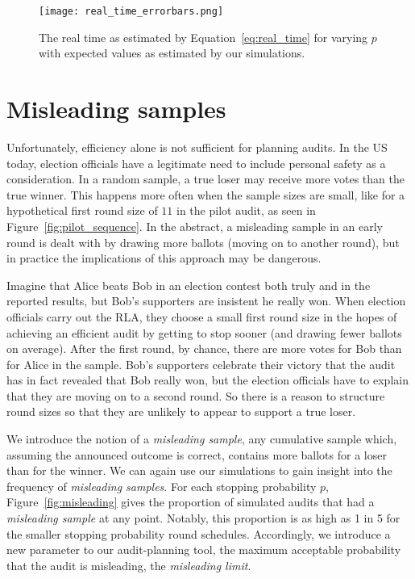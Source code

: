 \begin{figure}
\texttt{[image: real\_time\_errorbars.png]}
\caption{The real time as estimated by Equation~\ref{eq:real_time} for varying $p$ with expected values as estimated by our simulations.}
\label{fig:real_time}
\end{figure}


\section{Misleading samples}
\label{sec:misleading}

Unfortunately, efficiency alone is not sufficient for planning audits. In the US today, election officials have a legitimate need to include personal safety as a consideration.
In a random sample, a true loser may receive more votes than the true winner. This happens more often when the sample sizes are small, like for a hypothetical first round size of $11$ in the pilot audit, as seen in Figure~\ref{fig:pilot_sequence}.
In the abstract, a misleading sample in an early round is dealt with by drawing more ballots (moving on to another round), but in practice the implications of this approach may be dangerous.

Imagine that Alice beats Bob in an election contest both truly and in the reported results, but Bob's supporters are insistent he really won. When election officials carry out the RLA, they choose a small first round size in the hopes of achieving an efficient audit by getting to stop sooner (and drawing fewer ballots on average). 
After the first round, by chance, there are more votes for Bob than for Alice in the sample. Bob's supporters celebrate their victory that the audit has in fact revealed that Bob really won, but the election officials have to explain that they are moving on to a second round. 
So there is a reason to structure round sizes so that they are unlikely to appear to support a true loser.


We introduce the notion of a \emph{misleading sample}, any cumulative sample which, assuming the announced outcome is correct, contains more ballots for a loser than for the winner.
We can again use our simulations to gain insight into the frequency of \emph{misleading samples}.
For each stopping probability $p$, Figure~\ref{fig:misleading} gives the proportion of simulated audits that had a \emph{misleading sample} at any point. 
Notably, this proportion is as high as 1 in 5 for the smaller stopping probability round schedules.
Accordingly, we introduce a new parameter to our audit-planning tool, the maximum acceptable probability that the audit is misleading, the \emph{misleading limit}.

